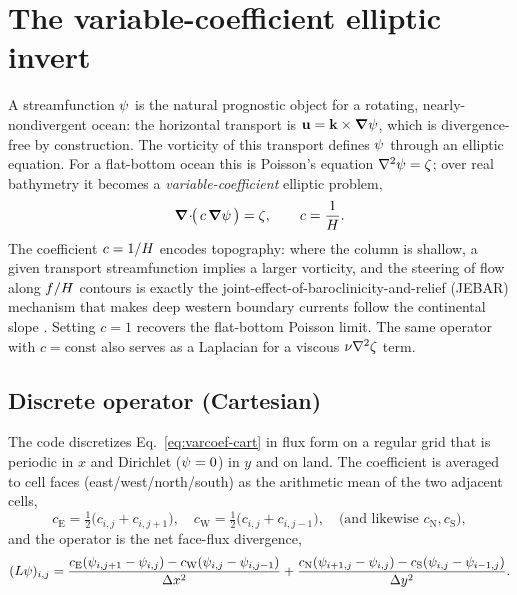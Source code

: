 \section{The variable-coefficient elliptic invert}\label{sec:varcoef}

A streamfunction $\psi$ is the natural prognostic object for a rotating, nearly-nondivergent
ocean: the horizontal transport is $\mathbf{u}=\mathbf{k}\times\boldsymbol{\nabla}\psi$, which is divergence-free by
construction. The vorticity of this transport defines $\psi$ through an elliptic equation. For
a flat-bottom ocean this is Poisson's equation $\nabla^{2}\psi=\zeta$; over real bathymetry it
becomes a \emph{variable-coefficient} elliptic problem,
\begin{equation}\label{eq:varcoef-cart}
  \boldsymbol{\nabla}\!\cdot\!\!\big(\,c\,\boldsymbol{\nabla}\psi\,\big)=\zeta,
  \qquad c=\frac{1}{H}.
\end{equation}
The coefficient $c=1/H$ encodes topography: where the column is shallow, a given transport
streamfunction implies a larger vorticity, and the steering of flow along $f/H$ contours
is exactly the joint-effect-of-baroclinicity-and-relief (JEBAR) mechanism that makes deep
western boundary currents follow the continental slope \citep{vallis2017}. Setting $c=1$
recovers the flat-bottom Poisson limit. The same operator with $c=\mathrm{const}$ also serves
as a Laplacian for a viscous $\nu\nabla^{2}\zeta$ term.

\subsection*{Discrete operator (Cartesian)}

The code discretizes Eq.~\eqref{eq:varcoef-cart} in flux form on a regular grid that is
periodic in $x$ and Dirichlet ($\psi=0$) in $y$ and on land. The coefficient is averaged to
cell faces (east/west/north/south) as the arithmetic mean of the two adjacent cells,
\begin{equation}
  c_{\mathrm E}=\tfrac12\big(c_{i,j}+c_{i,j+1}\big),\quad
  c_{\mathrm W}=\tfrac12\big(c_{i,j}+c_{i,j-1}\big),\quad\text{(and likewise }c_{\mathrm N},c_{\mathrm S}\text{)},
\end{equation}
and the operator is the net face-flux divergence,
\begin{equation}\label{eq:elliptic-op}
  (L\psi)_{i,j}=
  \frac{c_{\mathrm E}(\psi_{i,j+1}-\psi_{i,j})-c_{\mathrm W}(\psi_{i,j}-\psi_{i,j-1})}{\Delta x^{2}}
  +\frac{c_{\mathrm N}(\psi_{i+1,j}-\psi_{i,j})-c_{\mathrm S}(\psi_{i,j}-\psi_{i-1,j})}{\Delta y^{2}}.
\end{equation}

